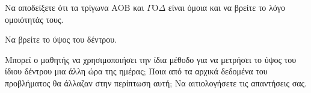 \begin{alist}
    \item
    \begin{rlist}
        \item Να αποδείξετε ότι τα τρίγωνα $\text{AOB}$ και $\Gamma\text{O}\Delta$ είναι όμοια και να βρείτε το λόγο ομοιότητάς τους. 
        \item Να βρείτε το ύψος του δέντρου. 
    \end{rlist}
    \item Μπορεί ο μαθητής να χρησιμοποιήσει την ίδια μέθοδο για να μετρήσει το ύψος του ίδιου δέντρου μια άλλη ώρα της ημέρας; Ποια από τα αρχικά δεδομένα του προβλήματος θα άλλαζαν στην περίπτωση αυτή; Να αιτιολογήσετε τις απαντήσεις σας. 
\end{alist}